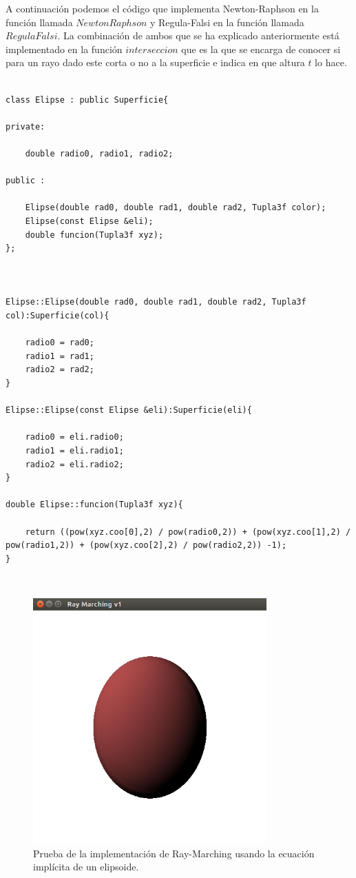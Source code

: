A continuación podemos el código que implementa Newton-Raphson en la función llamada $NewtonRaphson$ y Regula-Falsi en la función llamada $RegulaFalsi$. La combinación de ambos que se ha explicado anteriormente está implementado en la función $interseccion$ que es la que se encarga de conocer si para un rayo dado este corta o no a la superficie e indica en que altura $t$ lo hace.
${ }$\\

\begin{lstlisting}[style=Consola]

class Elipse : public Superficie{

private:

	double radio0, radio1, radio2;

public :

	Elipse(double rad0, double rad1, double rad2, Tupla3f color);
	Elipse(const Elipse &eli);
	double funcion(Tupla3f xyz);
};



Elipse::Elipse(double rad0, double rad1, double rad2, Tupla3f col):Superficie(col){

	radio0 = rad0;
	radio1 = rad1;
	radio2 = rad2;
}

Elipse::Elipse(const Elipse &eli):Superficie(eli){

	radio0 = eli.radio0;
	radio1 = eli.radio1;
	radio2 = eli.radio2;
}

double Elipse::funcion(Tupla3f xyz){

	return ((pow(xyz.coo[0],2) / pow(radio0,2)) + (pow(xyz.coo[1],2) / pow(radio1,2)) + (pow(xyz.coo[2],2) / pow(radio2,2)) -1);
}
\end{lstlisting}
${ }$\\




\begin{figure}[h]
	\begin{center}
		\includegraphics[width=0.8\textwidth]{imagenes/Prueba2.png}
	\end{center}
	\caption{Prueba de la implementación de Ray-Marching usando la ecuación implícita de un elipsoide.}
	\label{fig:etiq_10}
\end{figure}


